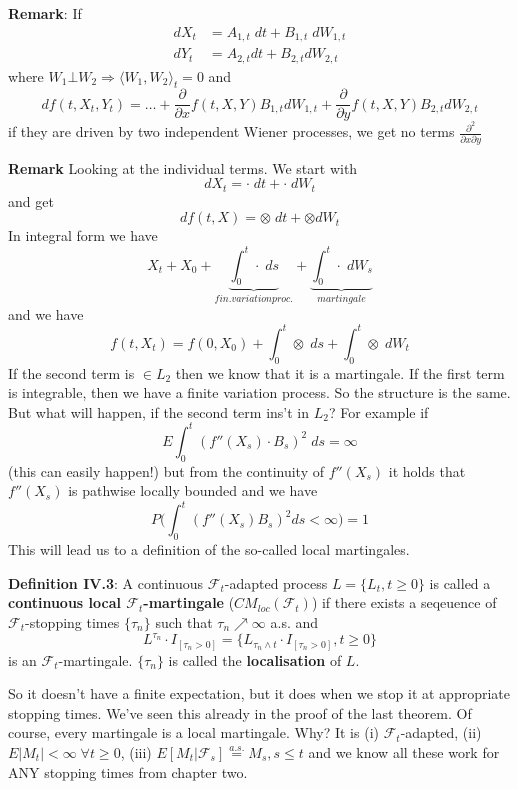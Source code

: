 \documentclass[english]{article}
\newcommand{\ub}{\underbrace}
\newcommand{\note}[1]{\noindent\textbf{#1}}
\newcommand{\F}{\mathcal F}
\newcommand{\as}[1]{\stackrel {a.s.}{#1}}
\begin{document}
\note{Remark}: If
\begin{align*} dX_t & = A_{1,t} \; dt + B_{1,t} \; dW_{1,t} \\
dY_t & = A_{2,t} dt + B_{2,t} dW_{2,t}
\end{align*}
where $W_1 \bot W_2 \Rightarrow \langle W_1, W_2 \rangle_t = 0$ and
$$df(t,X_t, Y_t) = \dots + \frac{\partial}{\partial x}f(t,X,Y) B_{1,t} dW_{1,t} + \frac{\partial}{\partial y}f(t,X,Y) B_{2,t} dW_{2,t}$$
if they are driven by two independent Wiener processes, we get no terms $\frac{\partial^2}{\partial x \partial y}$ \newline 

\note{Remark} Looking at the individual terms. We start with
$$dX_t = \cdot \;dt + \cdot \; dW_t$$
and get
$$df(t,X) = \otimes \; dt + \otimes dW_t$$
In integral form we have
$$X_t + X_0 + \ub{\int^t_0 \cdot \; ds}_{fin. variation proc.} + \ub{\int^t_0 \cdot \; dW_s}_{martingale}$$
and we have
$$f(t, X_t) = f(0 , X_0) + \int^t_0 \otimes \; ds + \int^t_0 \otimes \; dW_t$$
If the second term is $\in L_2$ then we know that it is a martingale. If the first term is integrable, then we have a finite variation process.\newline
So the structure is the same. But what will happen, if the second term ins't in $L_2$? For example if
$$E\int^t_0 (f''(X_s) \cdot B_s)^2 \; ds = \infty$$
(this can easily happen!) but from the continuity of $f''(X_s)$ it holds that $f''(X_s)$ is pathwise locally bounded and we have
$$P\Big(\int^t_0 (f'' (X_s) B_s)^2 ds < \infty \Big) = 1$$
This will lead us to a definition of the so-called local martingales. \newline

\note{Definition IV.3}: A continuous $\F_t$-adapted process $L= \{L_t, t\geq 0\}$ is called a \textbf{continuous local $\F_t$-martingale} ($CM_{loc}(\F_t)$) if there exists a seqeuence of $\F_t$-stopping times $\{\tau_n\}$ such that $\tau_n \nearrow \infty$ a.s. and 
$$L^{\tau_n} \cdot I_{[\tau_n > 0]} = \{L_{\tau_n \wedge t} \cdot I_{[\tau_n>0]}, t\geq 0\}$$
is an $\F_t$-martingale. $\{\tau_n\}$ is called the \textbf{localisation} of $L$. \newline

So it doesn't have a finite expectation, but it does when we stop it at appropriate stopping times. We've seen this already in the proof of the last theorem. Of course, every martingale is a local martingale. Why? It is (i) $\F_t$-adapted, (ii) $E|M_t|<\infty \; \forall t\geq 0$, (iii) $E[M_t |\F_s] \as = M_s, s \leq t$ and we know all these work for ANY stopping times from chapter two. \newline
\end{document}
